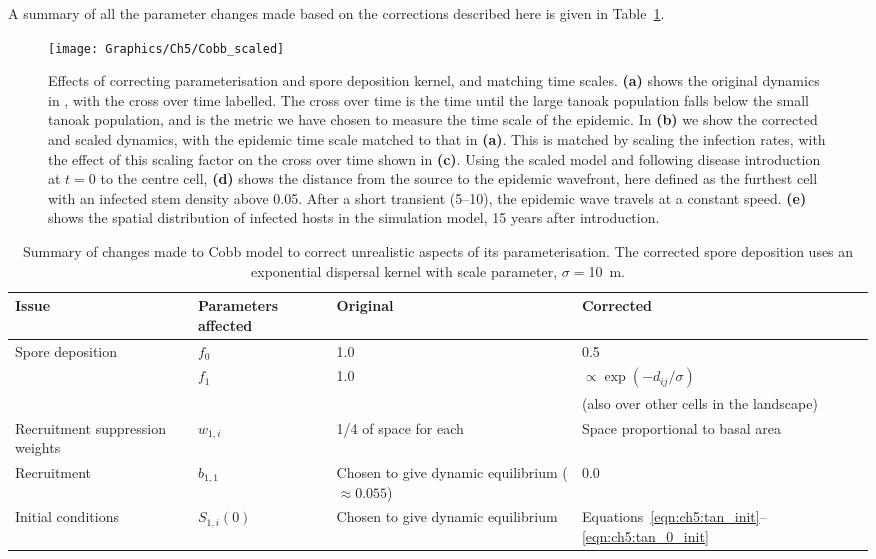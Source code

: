 A summary of all the parameter changes made based on the corrections described here is given in Table~\ref{tab:ch5:param_changes}.

\begin{figure}[h]
    \begin{center}
        \texttt{[image: Graphics/Ch5/Cobb\_scaled]}
        \caption[Effect of model reparameterisation and infection rate scaling]{Effects of correcting parameterisation and spore deposition kernel, and matching time scales. \textbf{(a)} shows the original dynamics in \citet{cobb_ecosystem_2012}, with the cross over time labelled. The cross over time is the time until the large tanoak population falls below the small tanoak population, and is the metric we have chosen to measure the time scale of the epidemic. In \textbf{(b)} we show the corrected and scaled dynamics, with the epidemic time scale matched to that in \textbf{(a)}. This is matched by scaling the infection rates, with the effect of this scaling factor on the cross over time shown in \textbf{(c)}. Using the scaled model and following disease introduction at $t=0$ to the centre cell, \textbf{(d)} shows the distance from the source to the epidemic wavefront, here defined as the furthest cell with an infected stem density above 0.05. After a short transient (\texttildelow\SIrange{5}{10}{\years}), the epidemic wave travels at a constant speed. \textbf{(e)} shows the spatial distribution of infected hosts in the simulation model, 15 years after introduction.\label{fig:ch5:inf_scaling}}
    \end{center}
\end{figure}

\begin{table}[h]
    \centering
    \caption[Summary of corrections to Cobb model]{Summary of changes made to Cobb model to correct unrealistic aspects of its parameterisation. The corrected spore deposition uses an exponential dispersal kernel with scale parameter, $\sigma=$\SI{10}{\meter}.\label{tab:ch5:param_changes}}
    \begin{tabular}{@{}p{3.5cm}p{2cm}p{4cm}p{3cm}@{}}
        \toprule
        \textbf{Issue} & \textbf{Parameters affected} & \textbf{Original} & \textbf{Corrected} \\
        \midrule
        Spore deposition & $f_0$ & 1.0 & 0.5 \\
        & $f_1$ & 1.0 & $\propto \exp{\left(-d_{ij}/\sigma\right)}$ \\
        &&&{\small{}(also over other cells in the landscape)}\\
        \midrule
        Recruitment suppression weights & $w_{1,i}$ & 1/4 of space for each & Space proportional to basal area \\
        \midrule
        Recruitment & $b_{1,1}$ & Chosen to give dynamic equilibrium ($\approx{}0.055$) & 0.0 \\
        \midrule
        Initial conditions & $S_{1,i}(0)$ & Chosen to give dynamic equilibrium & Equations~\ref{eqn:ch5:tan_init}--\ref{eqn:ch5:tan_0_init} \\
        \bottomrule
    \end{tabular}
\end{table}

